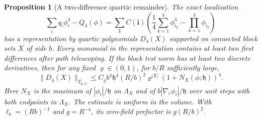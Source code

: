\documentclass[11pt]{article}
\newtheorem{proposition}{Proposition}[section]
\begin{document}
\begin{proposition}[A two-difference quartic remainder]\label{prop:quartic-local}
The exact localization
\begin{equation}\label{eq:q4exactlocal}
 \sum_i q_i\phi_i^4-Q_4(\phi)=\sum_{\boldsymbol i}C(\boldsymbol i)
   \left(\frac14\sum_{k=1}^4\phi_{i_k}^4-\prod_{k=1}^4\phi_{i_k}\right)
\end{equation}
has a representation by quartic polynomials \(D_4(X)\) supported
on connected block sets \(X\) of side \(b\). Every monomial in the
representation contains at least two first differences after path
telescoping. If the block test norm has at least two discrete
derivatives, then for any fixed \(\varrho\in(0,1)\), for \(b/R\)
sufficiently large,
\begin{equation}\label{eq:q4testlocal}
 \|D_4(X)\|_{T_{\mathfrak h,\phi}}
 \le C_\varrho b^4\mathfrak h^4 (R/b)^2\varrho^{|X|}
                    (1+N_X(\phi;\mathfrak h))^4 .
\end{equation}
Here \(N_X\) is the maximum of \(|\phi_i|/\mathfrak h\) on
\(\Lambda_X\) and of \(b|\nabla_e\phi_i|/\mathfrak h\) over unit
steps with both endpoints in \(\Lambda_X\). The estimate is
uniform in the volume. With \(\ell_b=(Rb)^{-1}\) and \(g=R^{-4}\),
its zero-field prefactor is \(g(R/b)^2\).
\end{proposition}
\end{document}

